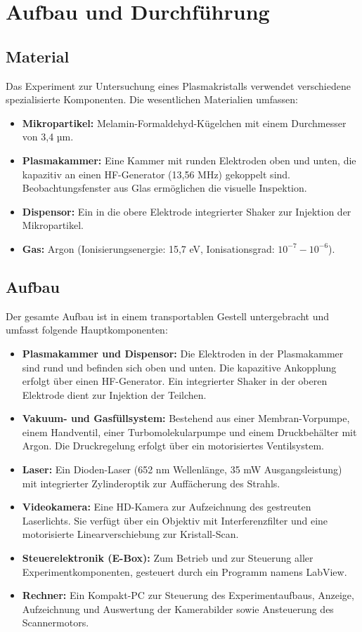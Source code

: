 \documentclass[12pt,a4paper,ngerman]{article}
\begin{document}
\section{Aufbau und Durchführung}
	\subsection{Material}
	Das Experiment zur Untersuchung eines Plasmakristalls verwendet verschiedene spezialisierte Komponenten. Die wesentlichen Materialien umfassen:

\begin{itemize}
    \item \textbf{Mikropartikel:} Melamin-Formaldehyd-Kügelchen mit einem Durchmesser von 3,4 µm.
    \item \textbf{Plasmakammer:} Eine Kammer mit runden Elektroden oben und unten, die kapazitiv an einen HF-Generator (13,56 MHz) gekoppelt sind. Beobachtungsfenster aus Glas ermöglichen die visuelle Inspektion.
    \item \textbf{Dispensor:} Ein in die obere Elektrode integrierter Shaker zur Injektion der Mikropartikel.
    \item \textbf{Gas:} Argon (Ionisierungsenergie: 15,7 eV, Ionisationsgrad: \(10^{-7} - 10^{-6}\)).
\end{itemize}

\subsection{Aufbau}
Der gesamte Aufbau ist in einem transportablen Gestell untergebracht und umfasst folgende Hauptkomponenten:
\begin{itemize}
    \item \textbf{Plasmakammer und Dispensor:} Die Elektroden in der Plasmakammer sind rund und befinden sich oben und unten. Die kapazitive Ankopplung erfolgt über einen HF-Generator. Ein integrierter Shaker in der oberen Elektrode dient zur Injektion der Teilchen.
    \item \textbf{Vakuum- und Gasfüllsystem:} Bestehend aus einer Membran-Vorpumpe, einem Handventil, einer Turbomolekularpumpe und einem Druckbehälter mit Argon. Die Druckregelung erfolgt über ein motorisiertes Ventilsystem.
    \item \textbf{Laser:} Ein Dioden-Laser (652 nm Wellenlänge, 35 mW Ausgangsleistung) mit integrierter Zylinderoptik zur Auffächerung des Strahls.
    \item \textbf{Videokamera:} Eine HD-Kamera zur Aufzeichnung des gestreuten Laserlichts. Sie verfügt über ein Objektiv mit Interferenzfilter und eine motorisierte Linearverschiebung zur Kristall-Scan.
    \item \textbf{Steuerelektronik (E-Box):} Zum Betrieb und zur Steuerung aller Experimentkomponenten, gesteuert durch ein Programm namens \glqq{}LabView\grqq{}.
    \item \textbf{Rechner:} Ein Kompakt-PC zur Steuerung des Experimentaufbaus, Anzeige, Aufzeichnung und Auswertung der Kamerabilder sowie Ansteuerung des Scannermotors.
\end{itemize}
\end{document}
